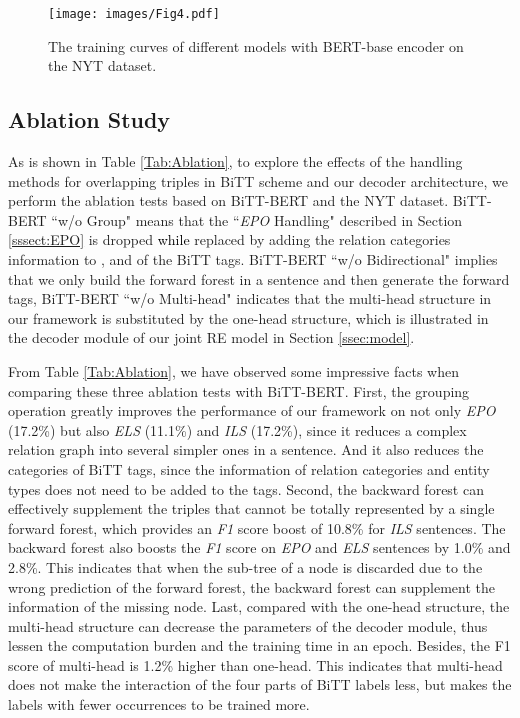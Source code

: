 \documentclass[conference]{IEEEtran}
\newcommand{\yankun}[1]{\textcolor{black}{#1}}
\begin{document}
\begin{figure}[t]
    \centering
    \texttt{[image: images/Fig4.pdf]}\\
    \caption{The training curves of different models with BERT-base encoder on the NYT dataset.}
    \label{Fig:Training}
\end{figure}











\subsection{Ablation Study}
As is shown in Table \ref{Tab:Ablation}, to explore the effects of the handling methods for overlapping triples in BiTT scheme and our decoder architecture, we perform the ablation tests based on BiTT-BERT and the NYT dataset. BiTT-BERT ``w/o Group" means that the ``\emph{EPO} Handling" described in Section \ref{sssect:EPO} is dropped \yankun{while} replaced by adding the relation categories information to ,  and  of the BiTT tags. BiTT-BERT ``w/o Bidirectional" implies that we only build the forward forest in a sentence and then generate the forward tags, 
BiTT-BERT ``w/o Multi-head" indicates that the multi-head structure in our framework is substituted by the one-head structure, which is illustrated in the decoder module of our joint RE model in Section \ref{ssec:model}.

From Table \ref{Tab:Ablation}, we have observed some impressive facts when comparing these three ablation tests with BiTT-BERT. First, the grouping operation greatly improves the performance of our framework on not only \emph{EPO} (17.2\%) but also \emph{ELS} (11.1\%) and \emph{ILS} (17.2\%), since it reduces a complex relation graph into several simpler ones in a sentence. And it also reduces the categories of BiTT tags, since the information of relation categories and entity types does not need to be added to the tags. Second, the backward forest can effectively supplement the triples that cannot be totally represented by a single forward forest, which provides an \emph{F1} score boost of 10.8\% for \emph{ILS} sentences. The backward forest also boosts the \emph{F1} score on \emph{EPO} and \emph{ELS} sentences by 1.0\% and 2.8\%. This indicates that when the sub-tree of a node is discarded due to the wrong prediction of the forward forest, the backward forest can supplement the information of the missing node. Last, compared with the one-head structure, the multi-head structure can decrease the parameters of the decoder module, thus lessen the computation burden and the training time in an epoch. Besides, the F1 score of multi-head is 1.2\% higher than one-head. This indicates that multi-head does not make the interaction of the four parts of BiTT labels less, but makes the labels with fewer occurrences to be trained more.
\end{document}
